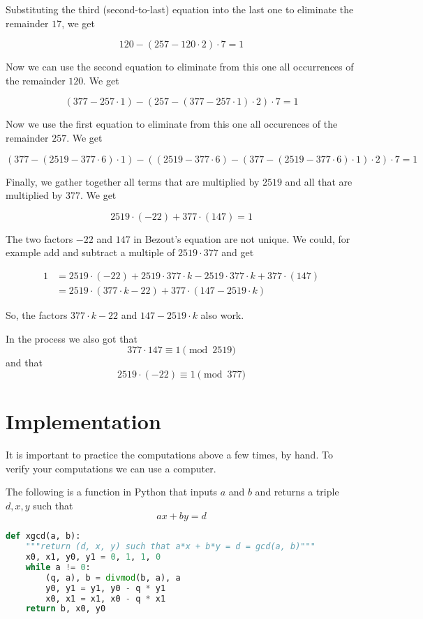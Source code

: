 \documentclass{amsart}
\newcounter{lem}[section]\setcounter{lem}{0}
\begin{document}
Substituting the third (second-to-last) equation into the last one to eliminate the remainder $17$, we get 

$$120-(257-120\cdot 2)\cdot 7=\boxed{1}$$

Now we can use the second equation to eliminate from this one all occurrences of the remainder $120$. We get 

$$(377-257\cdot1)-(257-(377-257\cdot1)\cdot 2)\cdot 7=\boxed{1}$$

Now we use the first equation to eliminate from this one all occurences of the remainder $257$. We get

$$(377-(2519-377\cdot 6)\cdot1)-((2519-377\cdot 6)-(377-(2519-377\cdot 6)\cdot1)\cdot 2)\cdot 7=\boxed{1}$$

Finally, we gather together all terms that are multiplied by $2519$ and all that are multiplied by $377$. We get

$$2519\cdot (-22)+377\cdot (147) =\boxed{1}$$

The two factors $-22$ and $147$ in Bezout's equation are not unique. We could, for example add and subtract a multiple of $2519\cdot 377$ and get 

\begin{align*}\boxed{1}&=2519\cdot (-22)+2519\cdot377\cdot k-2519\cdot377\cdot k+377\cdot (147)\\
&=2519\cdot (377\cdot k-22)+377\cdot (147-2519\cdot k)
\end{align*}

So, the factors $377\cdot k-22$ and $147-2519\cdot k$ also work.

In the process we also got that $$377\cdot 147\equiv1\pmod{2519}$$
and that $$2519\cdot (-22)\equiv1\pmod{377}$$

\section*{Implementation}

It is important to practice the computations above a few times, by hand. 
To verify your computations we can use a computer.

The following is a function in Python that inputs $a$ and $b$ and returns a triple $d,x,y$ such that $$ax+by=d$$

\begin{lstlisting}[language=Python]
def xgcd(a, b):
    """return (d, x, y) such that a*x + b*y = d = gcd(a, b)"""
    x0, x1, y0, y1 = 0, 1, 1, 0
    while a != 0:
        (q, a), b = divmod(b, a), a
        y0, y1 = y1, y0 - q * y1
        x0, x1 = x1, x0 - q * x1
    return b, x0, y0
\end{lstlisting}
\end{document}
